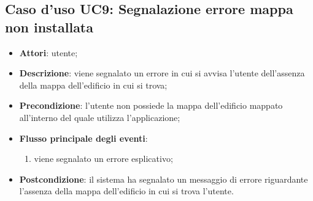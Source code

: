 \documentclass[../AnalisiDeiRequisiti.tex]{subfiles}
\begin{document}
\subsection{Caso d'uso UC9: Segnalazione errore mappa non installata}
\begin{itemize}
\item \textbf{Attori}: utente;
\item \textbf{Descrizione}: viene segnalato un errore in cui si avvisa l'utente dell'assenza della mappa dell'edificio in cui si trova; 
      \item \textbf{Precondizione}: l'utente non possiede la mappa dell'edificio mappato all'interno del quale utilizza l'applicazione;

        \item \textbf{Flusso principale degli eventi}:
          \begin{enumerate}
          \item viene segnalato un errore esplicativo;

      \end{enumerate}
    \item \textbf{Postcondizione}: il sistema ha segnalato un messaggio di errore riguardante l'assenza della mappa dell'edificio in cui si trova l'utente.
  \end{itemize}
\end{document}
